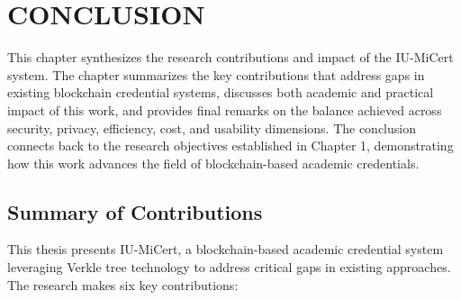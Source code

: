 \chapter{CONCLUSION}
\label{ch:conclusion}

This chapter synthesizes the research contributions and impact of the IU-MiCert system. The chapter summarizes the key contributions that address gaps in existing blockchain credential systems, discusses both academic and practical impact of this work, and provides final remarks on the balance achieved across security, privacy, efficiency, cost, and usability dimensions. The conclusion connects back to the research objectives established in Chapter 1, demonstrating how this work advances the field of blockchain-based academic credentials.

\section{Summary of Contributions}
\label{sec:contribution-summary}

This thesis presents IU-MiCert, a blockchain-based academic credential system leveraging Verkle tree technology to address critical gaps in existing approaches. The research makes six key contributions:

